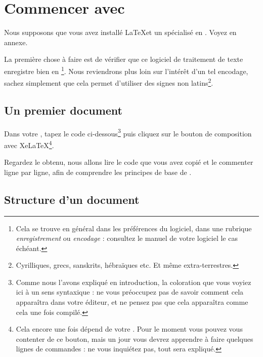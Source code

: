 \chapter{Commencer avec \logiciel{\LaTeX}}

\begin{prealable}
Nous supposons que vous avez installé \LaTeX et un  spécialisé en \logiciel{\LaTeX}. Voyez en annexe.

La première chose à faire est de vérifier que ce logiciel de traitement de texte enregistre bien en \footnote{Cela se trouve en général dans les préférences du logiciel, dans une rubrique \emph{enregistrement} ou \emph{encodage} : consultez le manuel de votre logiciel le cas échéant.}. Nous reviendrons plus loin sur l'intérêt d'un tel encodage, sachez simplement que cela permet d'utiliser des signes non latins\footnote{Cyrilliques, grecs, sanskrits, hébraïques etc. Et même extra-terrestres.}.

\end{prealable}

\section{Un premier document}

Dans votre , tapez le code ci-dessous\footnote{Comme nous l'avons expliqué en introduction, la coloration que vous voyiez ici à un sens syntaxique : ne vous préoccupez pas de savoir comment cela apparaîtra dans votre éditeur, et ne pensez pas que cela apparaîtra comme cela une fois compilé.} puis cliquez sur le bouton de composition avec Xe\LaTeX\footnote{Cela encore une fois dépend de votre . Pour le moment vous pouvez vous contenter de ce bouton, mais un jour vous devrez apprendre à faire quelques lignes de commandes : ne vous inquiétez pas, tout sera expliqué.}.


Regardez le  obtenu, nous allons lire le code que vous avez copié et le commenter ligne par ligne, afin de comprendre les principes de base de \logiciel{\LaTeX}.
\FloatBarrier

\section{Structure d'un document \logiciel{\LaTeX}}

